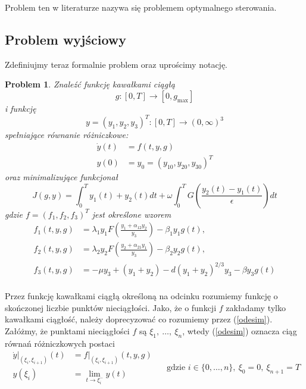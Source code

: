 \documentclass[11pt]{article}
\newtheorem{problem}{Problem}
\begin{document}
Problem ten w literaturze nazywa się problemem optymalnego sterowania.

\subsection{Problem wyjściowy}
Zdefiniujmy teraz formalnie problem oraz uprościmy notację.

\begin{problem}\label{problem}
  Znaleźć funkcję kawałkami ciągłą
  \[g: [0, T] \to [0, g_{\max}]\]
  i funkcję
  \[y = {(y_1, y_2, y_3)}^T: [0,T] \to {(0, \infty)}^3\]
  spełniające równanie różniczkowe:
  \begin{equation}\label{odesim}
    \begin{aligned}
      \dot{y}(t) &= f(t, y, g) \\
      y(0) &= y_0 = {(y_{10}, y_{20}, y_{30})}^T
    \end{aligned}
  \end{equation}
  oraz minimalizujące funkcjonał
  \begin{equation}\label{objfsim}
    J(g, y) = \int_0^T y_1(t) + y_2(t)dt + \omega\int_0^T G\left(\frac{y_2(t) - y_1(t)}{\epsilon}\right) dt
  \end{equation}
  gdzie $f = {(f_1, f_2, f_3)}^T$ jest określone wzorem
  \begin{equation}\label{dynamicsim}
    \begin{aligned}
      f_1(t, y, g) &= \lambda_1y_1F\left(\frac{y_1 + \alpha_{12}y_2}{y_3}\right) - \beta_1y_1g(t), \\
      f_2(t, y, g) &= \lambda_2y_2F\left(\frac{y_2 + \alpha_{21}y_1}{y_3}\right) - \beta_2y_2g(t), \\
      f_3(t, y, g) &= -\mu y_3 + (y_1+y_2) - d{(y_1 + y_2)}^{2/3}y_3 - \beta y_3 g(t) \\
    \end{aligned}
  \end{equation}
\end{problem}

Przez funkcję kawałkami ciągłą określoną na odcinku rozumiemy funkcję o skończonej liczbie punktów nieciągłości. Jako, że o funkcji $f$ zakładamy tylko kawałkami ciągłość, należy doprecyzować co rozumiemy przez (\ref{odesim}). Załóżmy, że punktami nieciągłości $f$ są $\xi_1,\ \ldots,\ \xi_n$, wtedy (\ref{odesim}) oznacza ciąg równań różniczkowych postaci
\begin{equation}\label{nonconode}
  \begin{aligned}
    \dot{y}|_{(\xi_i, \xi_{i+1})}(t) &= f|_{(\xi_i, \xi_{i+1})}(t, y, g)\\
    y(\xi_i) &= \lim_{t\to \xi_i^-}y(t)
  \end{aligned}
  \quad \text{ gdzie } i \in \{0,\ldots, n\},\ \xi_0 = 0,\ \xi_{n+1}=T
\end{equation}
\end{document}
